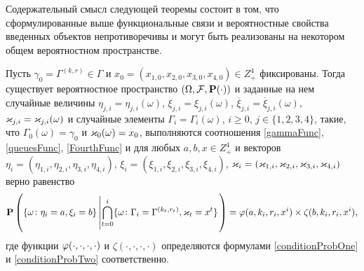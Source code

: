 \documentclass[a4paper,12pt,russian]{extarticle}
\newcommand{\G}{\Gamma}
\newcommand{\ga}[1]{\Gamma^{\left( #1 \right)} }
\renewcommand{\Pr}{{\mathbf P}}
\begin{document}
Содержательный смысл следующей теоремы состоит в том, что сформулированные выше функциональные связи и вероятностные свойства введенных объектов непротиворечивы и могут быть реализованы на некотором общем вероятностном пространстве.
\begin{theorem}
Пусть $\gamma_0=\ga{k,r} \in \G$ и $x_0=(x_{1,0},x_{2,0}, x_{3,0},x_{4,0})\in Z_+^4$ фиксированы.
Тогда существует вероятностное пространство $(\Omega, {\cal F}, \Pr(\cdot))$ и заданные на нем случайные величины $\eta_{j,i}=\eta_{j,i}(\omega)$, $\xi_{j,i}=\xi_{j,i}(\omega)$, $\overline{\xi}_{j,i}=\overline{\xi}_{j,i}(\omega)$,  $\varkappa_{j,i}=\varkappa_{j,i}(\omega)$ и случайные элементы $\G_i=\G_i(\omega)$, $i\geqslant 0$, $j\in \{1, 2, 3, 4\}$, такие, что $\G_0(\omega) = \gamma_0$ и $\varkappa_0(\omega)=x_0$, выполняются соотношения \eqref{gammaFunc}, \eqref{queuesFunc}, \eqref{FourthFunc} и для любых $a, b, x \in Z_+^4$ и векторов $\eta_i=(\eta_{1,i}, \eta_{2,i}, \eta_{3,i}, \eta_{4,i})$, $\xi_i=(\xi_{1,i}, \xi_{2,i}, \xi_{3,i}, \xi_{4,i})$, $\varkappa_i=(\varkappa_{1,i}, \varkappa_{2,i}, \varkappa_{3,i}, \varkappa_{4,i})$ верно равенство
\begin{equation*}
\Pr \left(\{ \omega \colon \eta_i = a, \xi_i=b\} \left|\bigcap_{t=0}^{i}\{\omega\colon \G_i=\ga{k_t,r_t}, \vk_t=x^t\}\right.\right)=
\vp(a,k_i,r_i,x^i)\times \zeta(b,k_i,r_i,x^i),
\end{equation*}
где функции $\varphi(\cdot, \cdot, \cdot, \cdot)$ и $\zeta(\cdot, \cdot, \cdot, \cdot)$ определяются формулами \eqref{conditionProbOne} и \eqref{conditionProbTwo} соответственно.
\label{myTheorem}
\end{theorem}
\end{document}
